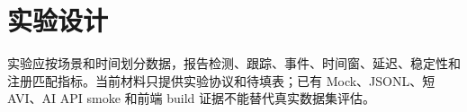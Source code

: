 \section{实验设计}

实验应按场景和时间划分数据，报告检测、跟踪、事件、时间窗、延迟、稳定性和注册匹配指标。当前材料只提供实验协议和待填表；已有 Mock、JSONL、短 AVI、AI API smoke 和前端 build 证据不能替代真实数据集评估。
